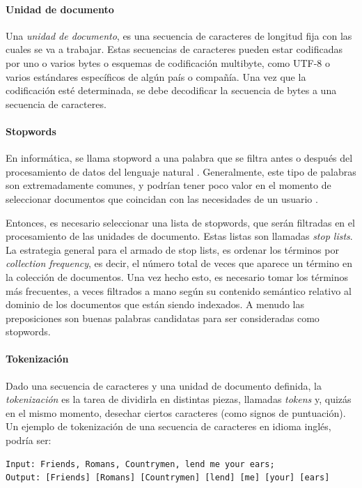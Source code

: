 \paragraph{Unidad de documento}
Una \textit{unidad de documento}, es una secuencia de caracteres de longitud fija con las cuales se va a trabajar. Estas secuencias de caracteres pueden estar codificadas por uno o varios bytes o esquemas de codificación multibyte, como UTF-8 o varios estándares específicos de algún país o compañía. Una vez que la codificación esté determinada, se debe decodificar la secuencia de bytes a una secuencia de caracteres.

\paragraph{Stopwords}
En informática, se llama stopword a una palabra que se filtra antes o después del procesamiento de datos del lenguaje natural \citep{leskovec2014mining}. Generalmente, este tipo de palabras son extremadamente comunes, y podrían tener poco valor en el momento de seleccionar documentos que coincidan con las necesidades de un usuario \citep{schutze2008introduction}.

\bigskip Entonces, es necesario seleccionar una lista de stopwords, que serán filtradas en el procesamiento de las unidades de documento. Estas listas son llamadas \textit{stop lists}. La estrategia general para el armado de stop lists, es ordenar los términos por \textit{collection frequency}, es decir, el número total de veces que aparece un término en la colección de documentos. Una vez hecho esto, es necesario tomar los términos más frecuentes, a veces filtrados a mano según su contenido semántico relativo al dominio de los documentos que están siendo indexados. A menudo las preposiciones son buenas palabras candidatas para ser consideradas como stopwords.

\paragraph{Tokenización}
Dado una secuencia de caracteres y una unidad de documento definida, la \textit{tokenización} es la tarea de dividirla en distintas piezas, llamadas \textit{tokens} y, quizás en el mismo momento, desechar ciertos caracteres (como signos de puntuación). Un ejemplo de tokenización de una secuencia de caracteres en idioma inglés, podría ser:

\begin{verbatim}
Input: Friends, Romans, Countrymen, lend me your ears;
Output: [Friends] [Romans] [Countrymen] [lend] [me] [your] [ears]
\end{verbatim}

